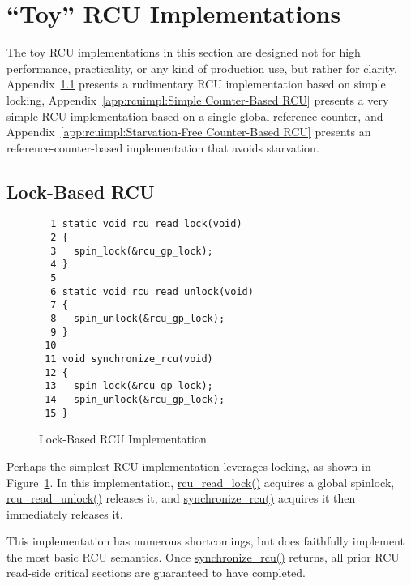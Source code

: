 
\section{``Toy'' RCU Implementations}
\label{app:rcuimpl:``Toy'' RCU Implementations}

The toy RCU implementations in this section are designed not for
high performance, practicality, or any kind of production use,
but rather for clarity.
Appendix~\ref{app:rcuimpl:Lock-Based RCU} presents a rudimentary
RCU implementation based on simple locking,
Appendix~\ref{app:rcuimpl:Simple Counter-Based RCU} presents a very
simple RCU implementation based on a single global reference counter,
and
Appendix~\ref{app:rcuimpl:Starvation-Free Counter-Based RCU} presents
an reference-counter-based implementation that avoids starvation.

\subsection{Lock-Based RCU}
\label{app:rcuimpl:Lock-Based RCU}

\begin{figure}[bp]
{ \scriptsize
\begin{verbatim}
  1 static void rcu_read_lock(void)
  2 {
  3   spin_lock(&rcu_gp_lock);
  4 }
  5 
  6 static void rcu_read_unlock(void)
  7 {
  8   spin_unlock(&rcu_gp_lock);
  9 }
 10 
 11 void synchronize_rcu(void)
 12 {
 13   spin_lock(&rcu_gp_lock);
 14   spin_unlock(&rcu_gp_lock);
 15 }
\end{verbatim}
}
\caption{Lock-Based RCU Implementation}
\label{fig:app:rcuimpl:Lock-Based RCU Implementation}
\end{figure}

Perhaps the simplest RCU implementation leverages locking, as
shown in
Figure~\ref{fig:app:rcuimpl:Lock-Based RCU Implementation}.
In this implementation, \url{rcu_read_lock()} acquires a global
spinlock, \url{rcu_read_unlock()} releases it, and
\url{synchronize_rcu()} acquires it then immediately releases it.

This implementation has numerous shortcomings, but does faithfully
implement the most basic RCU semantics.
Once \url{synchronize_rcu()} returns, all prior RCU read-side
critical sections are guaranteed to have completed.

